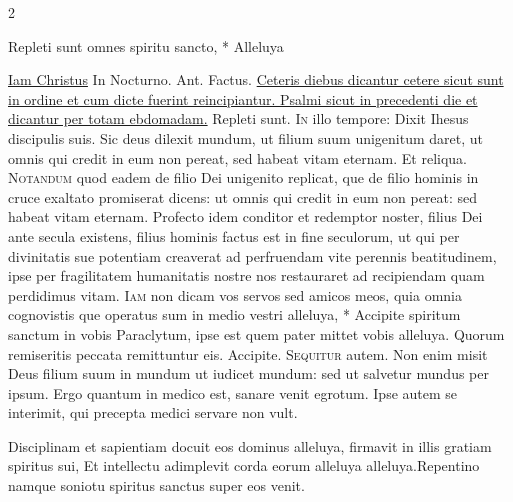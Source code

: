 \begin{multicols*}{2}
\begin{invitatory}
{Repleti sunt omnes spiritu sancto, * Alleluya}
\end{invitatory}
 \hyperlink{iam-christus-astra}{Iam Christus} {\color{Red} In Nocturno. Ant.} Factus. 
\newline \ul{Ceteris diebus dicantur cetere sicut sunt in ordine et cum dicte fuerint reincipiantur. Psalmi sicut in precedenti die et dicantur per totam ebdomadam.} \V Repleti sunt.
\lettrine[lines=2]{\zallmancaps \color{Red} I}{n} illo tempore: Dixit Ihesus discipulis suis. Sic deus dilexit mundum, ut filium suum unigenitum daret, ut omnis qui credit in eum non pereat, sed habeat vitam eternam. Et reliqua.
 \grecross
\lettrine[lines=2]{\zallmancaps \color{Blue} N}{otandum} quod eadem de filio Dei unigenito replicat, que de filio hominis in cruce exaltato promiserat dicens: ut omnis qui credit in eum non pereat: sed habeat vitam eternam. Profecto idem conditor et redemptor noster, filius Dei ante secula existens, filius hominis factus est in fine seculorum, ut qui per divinitatis sue potentiam creaverat ad perfruendam vite perennis beatitudinem, ipse per fragilitatem humanitatis nostre nos restauraret ad recipiendam quam perdidimus vitam. \R
\lettrine[lines=2]{\zallmancaps \color{Red} I}{am} \hypertarget{iam-non-dicam}{\label{iam-non-dicam}} non dicam vos servos sed amicos meos, quia omnia cognovistis que operatus sum in medio vestri alleluya, * Accipite spiritum sanctum in vobis Paraclytum, ipse est quem pater mittet vobis alleluya. \V Quorum remiseritis peccata remittuntur eis. Accipite.
\lettrine[lines=2]{\zallmancaps \color{Blue} S}{equitur} autem. Non enim misit Deus filium suum in mundum ut iudicet mundum: sed ut salvetur mundus per ipsum. Ergo quantum in medico est, sanare venit egrotum. Ipse autem se interimit, qui precepta medici servare non vult.
\begin{responsory}
{Disciplinam et sapientiam docuit eos dominus alleluya, firmavit in illis gratiam spiritus sui, Et intellectu adimplevit corda eorum alleluya alleluya.}{Repentino namque soniotu spiritus sanctus super eos venit.}

\end{responsory}
\end{multicols*}
